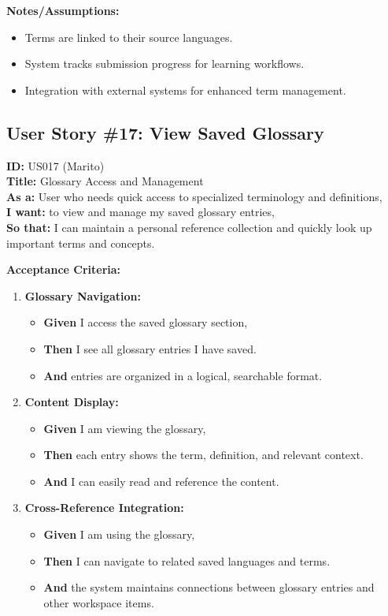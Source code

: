 \documentclass[12pt]{article}
\begin{document}
\vspace{1em}
\textbf{Notes/Assumptions:}
\begin{itemize}
    \item Terms are linked to their source languages.
    \item System tracks submission progress for learning workflows.
    \item Integration with external systems for enhanced term management.
\end{itemize}


\subsection{User Story \#17: View Saved Glossary}
\textbf{ID:} US017 (Marito) \\
\textbf{Title:} Glossary Access and Management \\
\textbf{As a:} User who needs quick access to specialized terminology and definitions, \\
\textbf{I want:} to view and manage my saved glossary entries, \\
\textbf{So that:} I can maintain a personal reference collection and quickly look up important terms and concepts.

\vspace{1em}
\textbf{Acceptance Criteria:}
\begin{enumerate}
    \item \textbf{Glossary Navigation:}
    \begin{itemize}
        \item \textbf{Given} I access the saved glossary section,
        \item \textbf{Then} I see all glossary entries I have saved.
        \item \textbf{And} entries are organized in a logical, searchable format.
    \end{itemize}

    \item \textbf{Content Display:}
    \begin{itemize}
        \item \textbf{Given} I am viewing the glossary,
        \item \textbf{Then} each entry shows the term, definition, and relevant context.
        \item \textbf{And} I can easily read and reference the content.
    \end{itemize}

    \item \textbf{Cross-Reference Integration:}
    \begin{itemize}
        \item \textbf{Given} I am using the glossary,
        \item \textbf{Then} I can navigate to related saved languages and terms.
        \item \textbf{And} the system maintains connections between glossary entries and other workspace items.
    \end{itemize}
\end{enumerate}
\end{document}
